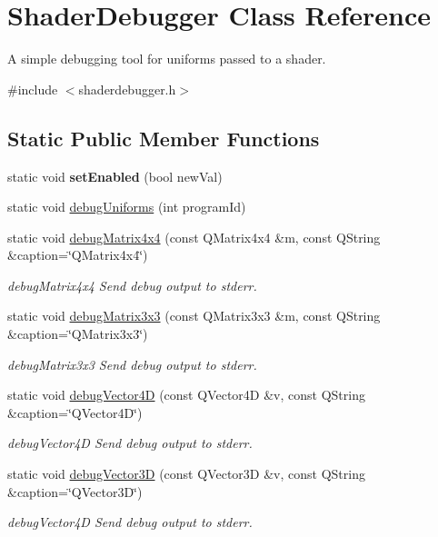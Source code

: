 \hypertarget{class_shader_debugger}{}\section{Shader\+Debugger Class Reference}
\label{class_shader_debugger}


A simple debugging tool for uniforms passed to a shader.  




{\ttfamily \#include $<$shaderdebugger.\+h$>$}

\subsection*{Static Public Member Functions}
\begin{DoxyCompactItemize}
\item 
\mbox{\label{class_shader_debugger_af7f777abe3673cac6a93b301ef539913}} 
static void {\bfseries set\+Enabled} (bool new\+Val)
\item 
static void \mbox{\hyperlink{class_shader_debugger_abe24abd2ac69db02f63c2fb4fc829080}{debug\+Uniforms}} (int program\+Id)
\item 
static void \mbox{\hyperlink{class_shader_debugger_a45249372f2e0c1e5bda7d200bb0dbfa8}{debug\+Matrix4x4}} (const Q\+Matrix4x4 \&m, const Q\+String \&caption=\char`\"{}Q\+Matrix4x4\char`\"{})
\begin{DoxyCompactList}\small\item\em debug\+Matrix4x4 Send debug output to stderr. \end{DoxyCompactList}\item 
static void \mbox{\hyperlink{class_shader_debugger_a6fd11ef28da124fd558f329d55629ee8}{debug\+Matrix3x3}} (const Q\+Matrix3x3 \&m, const Q\+String \&caption=\char`\"{}Q\+Matrix3x3\char`\"{})
\begin{DoxyCompactList}\small\item\em debug\+Matrix3x3 Send debug output to stderr. \end{DoxyCompactList}\item 
static void \mbox{\hyperlink{class_shader_debugger_a457fa04849102556e946cafdf9ea553e}{debug\+Vector4D}} (const Q\+Vector4D \&v, const Q\+String \&caption=\char`\"{}Q\+Vector4D\char`\"{})
\begin{DoxyCompactList}\small\item\em debug\+Vector4D Send debug output to stderr. \end{DoxyCompactList}\item 
static void \mbox{\hyperlink{class_shader_debugger_afd6536a3c6c74c4b6af32ad128ba50d0}{debug\+Vector3D}} (const Q\+Vector3D \&v, const Q\+String \&caption=\char`\"{}Q\+Vector3D\char`\"{})
\begin{DoxyCompactList}\small\item\em debug\+Vector4D Send debug output to stderr. \end{DoxyCompactList}\end{DoxyCompactItemize}


